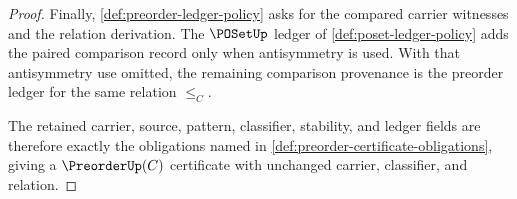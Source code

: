 \begin{proof}
Finally, \autoref{def:preorder-ledger-policy} asks for the compared carrier witnesses and the relation derivation. The $\POSetUp$ ledger of \autoref{def:poset-ledger-policy} adds the paired comparison record only when antisymmetry is used. With that antisymmetry use omitted, the remaining comparison provenance is the preorder ledger for the same relation $\le_C$.

The retained carrier, source, pattern, classifier, stability, and ledger fields are therefore exactly the obligations named in \autoref{def:preorder-certificate-obligations}, giving a $\PreorderUp(C)$ certificate with unchanged carrier, classifier, and relation.
\end{proof}

